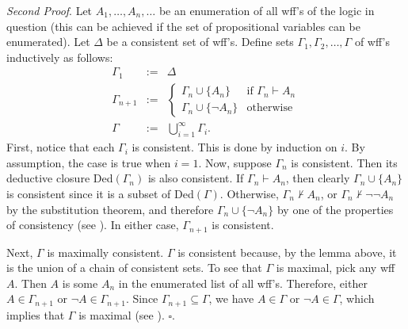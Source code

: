 \documentclass[12pt]{article}
\begin{document}
\textit{Second Proof}.  Let $A_1,\ldots, A_n, \ldots$ be an enumeration of all wff's of the logic in question (this can be achieved if the set of propositional variables can be enumerated).  Let $\Delta$ be a consistent set of wff's.  Define sets $\Gamma_1, \Gamma_2, \ldots, \Gamma$ of wff's inductively as follows:
\begin{eqnarray*}
\Gamma_1 &:=& \Delta \\
\Gamma_{n+1} &:=&
\begin{cases}
\Gamma_n \cup \lbrace A_n \rbrace & \textrm{if }\Gamma_n \vdash A_n \\
\Gamma_n \cup \lbrace \neg A_n \rbrace & \textrm{otherwise}
\end{cases} \\
\Gamma &:=& \bigcup_{i=1}^{\infty} \Gamma_i.
\end{eqnarray*}
First, notice that each $\Gamma_i$ is consistent.  This is done by induction on $i$.  By assumption, the case is true when $i=1$.  Now, suppose $\Gamma_n$ is consistent.  Then its deductive closure Ded$(\Gamma_n)$ is also consistent.  If $\Gamma_n \vdash A_n$, then clearly $\Gamma_n \cup \lbrace A_n \rbrace$ is consistent since it is a subset of Ded$(\Gamma)$.  Otherwise, $\Gamma_n \not\vdash A_n$, or $\Gamma_n \not\vdash \neg \neg A_n$ by the substitution theorem, and therefore $\Gamma_n \cup \lbrace \neg A_n \rbrace$ by one of the properties of consistency (see ).  In either case, $\Gamma_{n+1}$ is consistent.

Next, $\Gamma$ is maximally consistent.  $\Gamma$ is consistent because, by the lemma above, it is the union of a chain of consistent sets.  To see that $\Gamma$ is maximal, pick any wff $A$.  Then $A$ is some $A_n$ in the enumerated list of all wff's.  Therefore, either $A\in \Gamma_{n+1}$ or $\neg A\in \Gamma_{n+1}$.  Since $\Gamma_{n+1}\subseteq \Gamma$, we have $A\in \Gamma$ or $\neg A\in \Gamma$, which implies that $\Gamma$ is maximal (see ). \hfill $\square$.
\end{document}
